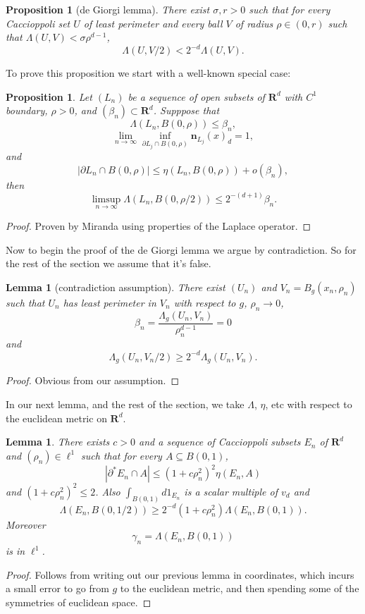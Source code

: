 \documentclass[reqno,12pt,letterpaper]{amsart}
\newcommand{\RR}{\mathbf{R}}
\newcommand{\normal}{\mathbf n}
\newtheorem{lemma}[theorem]{Lemma}
\newtheorem{proposition}[theorem]{Proposition}
\theoremstyle{definition}
\numberwithin{equation}{section}
\begin{document}
\begin{proposition}[de Giorgi lemma]
There exist $\sigma, r > 0$ such that for every Caccioppoli set $U$ of least perimeter and every ball $V$ of radius $\rho \in (0, r)$ such that $\Lambda(U, V) < \sigma \rho^{d - 1}$,
$$\Lambda(U, V/2) < 2^{-d} \Lambda(U, V).$$
\end{proposition}

To prove this proposition we start with a well-known special case:

\begin{proposition}
Let $(L_n)$ be a sequence of open subsets of $\RR^d$ with $C^1$ boundary, $\rho > 0$, and $(\beta_n) \subset \RR^d$.
Supppose that
$$\Lambda(L_n, B(0, \rho)) \leq \beta_n,$$
$$\lim_{n \to \infty} \inf_{\partial L_j \cap B(0, \rho)} \normal_{L_j}(x)_d = 1,$$
and
$$|\partial L_n \cap B(0, \rho)| \leq \eta(L_n, B(0, \rho)) + o(\beta_n),$$
then
$$\limsup_{n \to \infty} \Lambda(L_n, B(0, \rho/2)) \leq 2^{-(d+1)} \beta_n.$$
\end{proposition}
\begin{proof}
Proven by Miranda using properties of the Laplace operator.
\end{proof}

Now to begin the proof of the de Giorgi lemma we argue by contradiction.
So for the rest of the section we assume that it's false.

\begin{lemma}[contradiction assumption]
There exist $(U_n)$ and $V_n = B_g(x_n, \rho_n)$ such that $U_n$ has least perimeter in $V_n$ with respect to $g$, $\rho_n \to 0$,
$$\beta_n = \frac{\Lambda_g(U_n, V_n)}{\rho_n^{d - 1}} = 0$$
and
$$\Lambda_g(U_n, V_n/2) \geq 2^{-d} \Lambda_g(U_n, V_n).$$
\end{lemma}
\begin{proof}
Obvious from our assumption.
\end{proof}

In our next lemma, and the rest of the section, we take $\Lambda$, $\eta$, etc with respect to the euclidean metric on $\RR^d$.

\begin{lemma}
There exists $c > 0$ and a sequence of Caccioppoli subsets $E_n$ of $\RR^d$ and $(\rho_n) \in \ell^1$ such that for every $A \subseteq B(0, 1)$,
$$|\partial^* E_n \cap A| \leq (1 + c\rho_n^2)^2 \eta(E_n, A)$$
and $(1 + c\rho_n^2)^2 \leq 2$. Also $\int_{B(0, 1)} d1_{E_n}$ is a scalar multiple of $v_d$ and
$$\Lambda(E_n, B(0, 1/2)) \geq 2^{-d} (1 + c\rho_n^2) \Lambda(E_n, B(0, 1)).$$
Moreover
$$\gamma_n = \Lambda(E_n, B(0, 1))$$
is in $\ell^1$.
\end{lemma}
\begin{proof}
Follows from writing out our previous lemma in coordinates, which incurs a small error to go from $g$ to the euclidean metric, and then spending some of the symmetries of euclidean space.
\end{proof}
\end{document}
